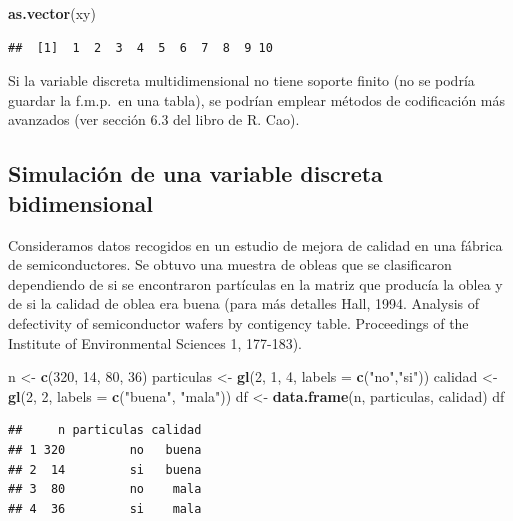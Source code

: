 \documentclass[]{book}
\newenvironment{Shaded}{\begin{snugshade}}{\end{snugshade}}
\newcommand{\KeywordTok}[1]{\textcolor[rgb]{0.13,0.29,0.53}{\textbf{#1}}}
\newcommand{\DataTypeTok}[1]{\textcolor[rgb]{0.13,0.29,0.53}{#1}}
\newcommand{\DecValTok}[1]{\textcolor[rgb]{0.00,0.00,0.81}{#1}}
\newcommand{\StringTok}[1]{\textcolor[rgb]{0.31,0.60,0.02}{#1}}
\newcommand{\NormalTok}[1]{#1}
\theoremstyle{definition}
\theoremstyle{definition}
\theoremstyle{definition}
\theoremstyle{remark}
\begin{document}
\begin{Shaded}
\begin{Highlighting}[]
\KeywordTok{as.vector}\NormalTok{(xy)}
\end{Highlighting}
\end{Shaded}

\begin{verbatim}
##  [1]  1  2  3  4  5  6  7  8  9 10
\end{verbatim}

Si la variable discreta multidimensional no tiene soporte finito (no se
podría guardar la f.m.p.~en una tabla), se podrían emplear métodos de
codificación más avanzados (ver sección 6.3 del libro de R. Cao).

\subsection{Simulación de una variable discreta
bidimensional}\label{simulacion-de-una-variable-discreta-bidimensional}

Consideramos datos recogidos en un estudio de mejora de calidad en una
fábrica de semiconductores. Se obtuvo una muestra de obleas que se
clasificaron dependiendo de si se encontraron partículas en la matriz
que producía la oblea y de si la calidad de oblea era buena (para más
detalles Hall, 1994. Analysis of defectivity of semiconductor wafers by
contigency table. Proceedings of the Institute of Environmental Sciences
1, 177-183).

\begin{Shaded}
\begin{Highlighting}[]
\NormalTok{n <-}\StringTok{ }\KeywordTok{c}\NormalTok{(}\DecValTok{320}\NormalTok{, }\DecValTok{14}\NormalTok{, }\DecValTok{80}\NormalTok{, }\DecValTok{36}\NormalTok{)}
\NormalTok{particulas <-}\StringTok{ }\KeywordTok{gl}\NormalTok{(}\DecValTok{2}\NormalTok{, }\DecValTok{1}\NormalTok{, }\DecValTok{4}\NormalTok{, }\DataTypeTok{labels =} \KeywordTok{c}\NormalTok{(}\StringTok{"no"}\NormalTok{,}\StringTok{"si"}\NormalTok{))}
\NormalTok{calidad <-}\StringTok{ }\KeywordTok{gl}\NormalTok{(}\DecValTok{2}\NormalTok{, }\DecValTok{2}\NormalTok{, }\DataTypeTok{labels =} \KeywordTok{c}\NormalTok{(}\StringTok{"buena"}\NormalTok{, }\StringTok{"mala"}\NormalTok{))}
\NormalTok{df <-}\StringTok{ }\KeywordTok{data.frame}\NormalTok{(n, particulas, calidad)}
\NormalTok{df}
\end{Highlighting}
\end{Shaded}

\begin{verbatim}
##     n particulas calidad
## 1 320         no   buena
## 2  14         si   buena
## 3  80         no    mala
## 4  36         si    mala
\end{verbatim}
\end{document}
